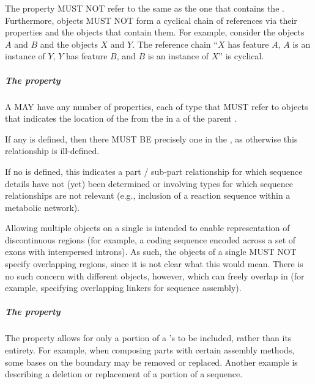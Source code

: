 The  property MUST NOT refer to the same  as the one that contains the .
Furthermore,  objects MUST NOT form a cyclical chain of references via their  properties and the  objects that contain them.
For example, consider the  objects $A$ and $B$ and the  objects $X$ and $Y$. The reference chain ``$X$ has feature $A$, $A$ is an instance of $Y$, $Y$ has feature $B$, and $B$ is an instance of $X$'' is cyclical.


\subparagraph{The  property}\label{sec:hasLocation:SC}

A  MAY have any number of  properties, each of type  that MUST refer to  objects that indicates the location of the  from the   in a  of the parent .

If any  is defined, then there MUST BE precisely one  in the  , as otherwise this relationship is ill-defined.

If no  is defined, this indicates a part / sub-part relationship for which sequence details have not (yet) been determined or involving types for which sequence relationships are not relevant (e.g., inclusion of a reaction sequence within a metabolic network).

Allowing multiple  objects on a single  is intended to enable representation of discontinuous regions (for example, a coding sequence encoded across a set of exons with interspersed introns).
As such, the  objects of a single  MUST NOT specify overlapping regions, since it is not clear what this would mean.
There is no such concern with different objects, however, which can freely overlap in  (for example, specifying overlapping linkers for sequence assembly).


\subparagraph{The  property}\label{sec:sourceLocation}

The  property allows for only a portion of a 's  to be included, rather than its entirety.
For example, when composing parts with certain assembly methods, some bases on the boundary may be removed or replaced.
Another example is describing a deletion or replacement of a portion of a sequence.

